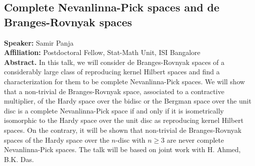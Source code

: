 \subsection*{Complete Nevanlinna-Pick spaces and  de Branges-Rovnyak spaces} %
\noindent
\textbf{Speaker:} Samir Panja \\ %
\textbf{Affiliation:} Postdoctoral Fellow, Stat-Math Unit, ISI Bangalore \\ %

\noindent\textbf{Abstract.} In this talk, we  will consider de Branges-Rovnyak spaces of a considerably large class of reproducing kernel Hilbert spaces and find a characterization for them to be complete Nevanlinna-Pick spaces. 
    We will show that a non-trivial de Branges-Rovnyak space, associated to a contractive multiplier, of the Hardy space over the bidisc or the Bergman space over the unit disc is a complete Nevanlinna-Pick space if and only if it is isometrically isomorphic to the Hardy space over the unit disc as reproducing kernel Hilbert spaces. On the contrary, it will be shown that non-trivial de Branges-Rovnyak spaces of the Hardy space over the $n$-disc with $n\geq 3$ are never complete Nevanlinna-Pick spaces.  The talk will be based on joint work with H. Ahmed, B.K. Das.


